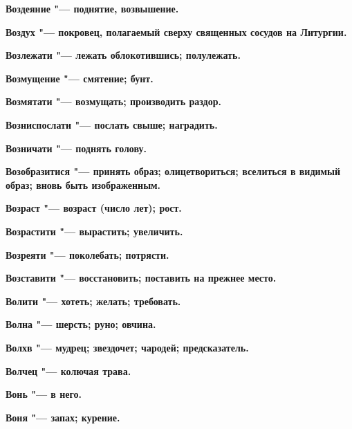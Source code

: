 \begin{mymulticols}{2}
\bfseries Воздеяние\normalfont{} "--- поднятие, возвышение. 




\bfseries Воздух\normalfont{} "--- покровец, полагаемый сверху священных сосудов на Литургии. 




\bfseries Возлежати\normalfont{} "--- лежать облокотившись; полулежать. 




\bfseries Возмущение\normalfont{} "--- смятение; бунт. 




\bfseries Возмятати\normalfont{} "--- возмущать; производить раздор. 




\bfseries Возниспослати\normalfont{} "--- послать свыше; наградить. 




\bfseries Возничати\normalfont{} "--- поднять голову. 




\bfseries Возобразитися\normalfont{} "--- принять образ; олицетвориться; вселиться в видимый образ; вновь быть изображенным. 




\bfseries Возраст\normalfont{} "--- возраст (число лет); рост. 




\bfseries Возрастити\normalfont{} "--- вырастить; увеличить. 




\bfseries Возреяти\normalfont{} "--- поколебать; потрясти. 




\bfseries Возставити\normalfont{} "--- восстановить; поставить на прежнее место. 




\bfseries Волити\normalfont{} "--- хотеть; желать; требовать. 




\bfseries Волна\normalfont{} "--- шерсть; руно; овчина. 




\bfseries Волхв\normalfont{} "--- мудрец; звездочет; чародей; предсказатель. 




\bfseries Волчец\normalfont{} "--- колючая трава. 




\bfseries Вонь\normalfont{} "--- в него. 




\bfseries Воня\normalfont{} "--- запах; курение. 





\end{mymulticols}
